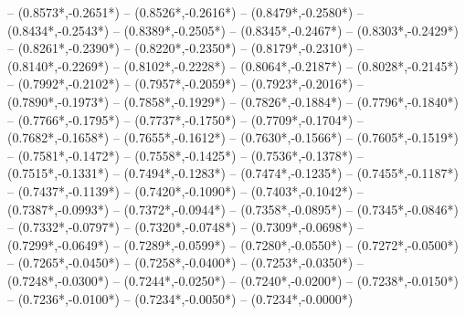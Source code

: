 {	-- ({0.8573*\dx},{-0.2651*\dy})
	-- ({0.8526*\dx},{-0.2616*\dy})
	-- ({0.8479*\dx},{-0.2580*\dy})
	-- ({0.8434*\dx},{-0.2543*\dy})
	-- ({0.8389*\dx},{-0.2505*\dy})
	-- ({0.8345*\dx},{-0.2467*\dy})
	-- ({0.8303*\dx},{-0.2429*\dy})
	-- ({0.8261*\dx},{-0.2390*\dy})
	-- ({0.8220*\dx},{-0.2350*\dy})
	-- ({0.8179*\dx},{-0.2310*\dy})
	-- ({0.8140*\dx},{-0.2269*\dy})
	-- ({0.8102*\dx},{-0.2228*\dy})
	-- ({0.8064*\dx},{-0.2187*\dy})
	-- ({0.8028*\dx},{-0.2145*\dy})
	-- ({0.7992*\dx},{-0.2102*\dy})
	-- ({0.7957*\dx},{-0.2059*\dy})
	-- ({0.7923*\dx},{-0.2016*\dy})
	-- ({0.7890*\dx},{-0.1973*\dy})
	-- ({0.7858*\dx},{-0.1929*\dy})
	-- ({0.7826*\dx},{-0.1884*\dy})
	-- ({0.7796*\dx},{-0.1840*\dy})
	-- ({0.7766*\dx},{-0.1795*\dy})
	-- ({0.7737*\dx},{-0.1750*\dy})
	-- ({0.7709*\dx},{-0.1704*\dy})
	-- ({0.7682*\dx},{-0.1658*\dy})
	-- ({0.7655*\dx},{-0.1612*\dy})
	-- ({0.7630*\dx},{-0.1566*\dy})
	-- ({0.7605*\dx},{-0.1519*\dy})
	-- ({0.7581*\dx},{-0.1472*\dy})
	-- ({0.7558*\dx},{-0.1425*\dy})
	-- ({0.7536*\dx},{-0.1378*\dy})
	-- ({0.7515*\dx},{-0.1331*\dy})
	-- ({0.7494*\dx},{-0.1283*\dy})
	-- ({0.7474*\dx},{-0.1235*\dy})
	-- ({0.7455*\dx},{-0.1187*\dy})
	-- ({0.7437*\dx},{-0.1139*\dy})
	-- ({0.7420*\dx},{-0.1090*\dy})
	-- ({0.7403*\dx},{-0.1042*\dy})
	-- ({0.7387*\dx},{-0.0993*\dy})
	-- ({0.7372*\dx},{-0.0944*\dy})
	-- ({0.7358*\dx},{-0.0895*\dy})
	-- ({0.7345*\dx},{-0.0846*\dy})
	-- ({0.7332*\dx},{-0.0797*\dy})
	-- ({0.7320*\dx},{-0.0748*\dy})
	-- ({0.7309*\dx},{-0.0698*\dy})
	-- ({0.7299*\dx},{-0.0649*\dy})
	-- ({0.7289*\dx},{-0.0599*\dy})
	-- ({0.7280*\dx},{-0.0550*\dy})
	-- ({0.7272*\dx},{-0.0500*\dy})
	-- ({0.7265*\dx},{-0.0450*\dy})
	-- ({0.7258*\dx},{-0.0400*\dy})
	-- ({0.7253*\dx},{-0.0350*\dy})
	-- ({0.7248*\dx},{-0.0300*\dy})
	-- ({0.7244*\dx},{-0.0250*\dy})
	-- ({0.7240*\dx},{-0.0200*\dy})
	-- ({0.7238*\dx},{-0.0150*\dy})
	-- ({0.7236*\dx},{-0.0100*\dy})
	-- ({0.7234*\dx},{-0.0050*\dy})
	-- ({0.7234*\dx},{-0.0000*\dy})
}
